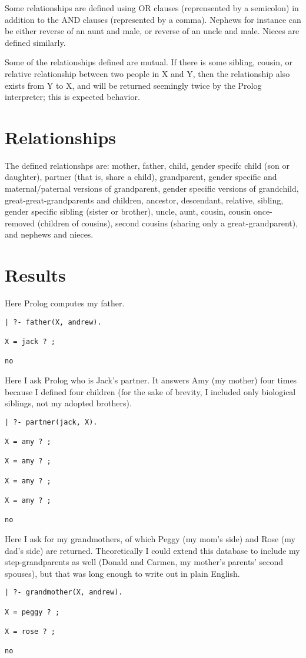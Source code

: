 \documentclass[12pt, article]{scrartcl}
\begin{document}
Some relationships are defined using OR clauses (reprensented by a semicolon) in addition to the AND clauses (represented by a comma). Nephews for instance can be either reverse of an aunt and male, or reverse of an uncle and male. Nieces are defined similarly.

Some of the relationships defined are mutual. If there is some sibling, cousin, or relative relationship between two people in X and Y, then the relationship also exists from Y to X, and will be returned seemingly twice by the Prolog interpreter; this is expected behavior.

\section{Relationships}
The defined relationshps are: mother, father, child, gender specifc child (son or daughter), partner (that is, share a child), grandparent, gender specific and maternal/paternal versions of grandparent, gender specific versions of grandchild, great-great-grandparents and children, ancestor, descendant, relative, sibling, gender specific sibling (sister or brother), uncle, aunt, cousin, cousin once-removed (children of cousins), second cousins (sharing only a great-grandparent), and nephews and nieces.

\section{Results}
Here Prolog computes my father.
\begin{verbatim}
| ?- father(X, andrew).

X = jack ? ;

no
\end{verbatim}

Here I ask Prolog who is Jack's partner. It answers Amy (my mother) four times because I defined four children (for the sake of brevity, I included only biological siblings, not my adopted brothers).
\begin{verbatim}
| ?- partner(jack, X).

X = amy ? ;

X = amy ? ;

X = amy ? ;

X = amy ? ;

no
\end{verbatim}

Here I ask for my grandmothers, of which Peggy (my mom's side) and Rose (my dad's side) are returned. Theoretically I could extend this database to include my step-grandparents as well (Donald and Carmen, my mother's parents' second spouses), but that was long enough to write out in plain English.
\begin{verbatim}
| ?- grandmother(X, andrew).

X = peggy ? ;

X = rose ? ;

no
\end{verbatim}
\end{document}
